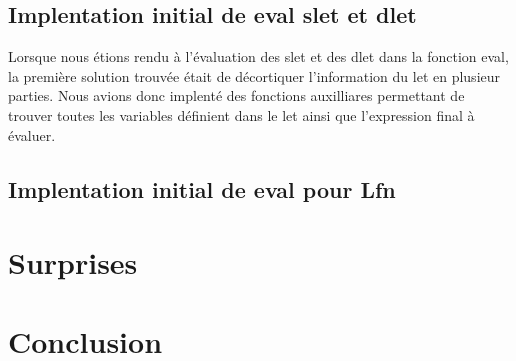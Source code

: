 \documentclass[12pt, letterpaper]{article}
\begin{document}
\subsection*{Implentation initial de eval slet et dlet}

Lorsque nous étions rendu à l'évaluation des slet et des dlet dans la fonction
eval, la première solution trouvée était de décortiquer l'information du let
en plusieur parties. Nous avions donc implenté des fonctions auxilliares
permettant de trouver toutes les variables définient dans le let ainsi que
l'expression final à évaluer.

\subsection*{Implentation initial de eval pour Lfn}

\section*{Surprises}

\section*{Conclusion}
\end{document}
